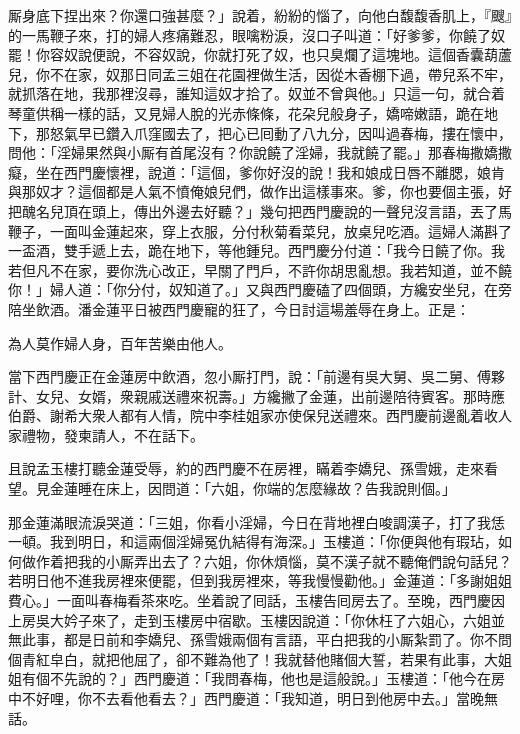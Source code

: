 厮身底下捏出來？你還口強甚麼？」說着，紛紛的惱了，向他白馥馥香肌上，『颼』的一馬鞭子來，打的婦人疼痛難忍，眼噙粉淚，沒口子叫道：「好爹爹，你饒了奴罷！你容奴說便說，不容奴說，你就打死了奴，也只臭爛了這塊地。這個香囊葫蘆兒，你不在家，奴那日同孟三姐在花園裡做生活，因從木香棚下過，帶兒系不牢，就抓落在地，{}我那裡沒尋，誰知這奴才拾了。奴並不曾與他。」{}只這一句，就合着琴童供稱一樣的話，又見婦人脫的光赤條條，花朶兒般身子，嬌啼嫩語，跪在地下，那怒氣早已鑽入爪窪國去了，把心已囘動了八九分，因叫過春梅，摟在懷中，問他：{}「淫婦果然與小厮有首尾沒有？你說饒了淫婦，我就饒了罷。」那春梅撒嬌撒癡，坐在西門慶懷裡，說道：「這個，爹你好沒的說！我和娘成日唇不離腮，娘肯與那奴才？這個都是人氣不憤俺娘兒們，做作出這樣事來。爹，你也要個主張，好把醜名兒頂在頭上，傳出外邊去好聽？」{}幾句把西門慶說的一聲兒沒言語，丟了馬鞭子，一面叫金蓮起來，穿上衣服，{}分付秋菊看菜兒，放桌兒吃酒。這婦人滿斟了一盃酒，雙手遞上去，跪在地下，等他鍾兒。西門慶分付道：「我今日饒了你。我若但凡不在家，要你洗心改正，早關了門戶，不許你胡思亂想。我若知道，並不饒你！」婦人道：「你分付，奴知道了。」{}又與西門慶磕了四個頭，方纔安坐兒，在旁陪坐飲酒。潘金蓮平日被西門慶寵的狂了，今日討這場羞辱在身上。正是：

\begin{myquote}
為人莫作婦人身，百年苦樂由他人。
\end{myquote}

當下西門慶正在金蓮房中飲酒，忽小厮打門，說：「前邊有吳大舅、吳二舅、傅夥計、女兒、女婿，衆親戚送禮來祝壽。」方纔撇了金蓮，出前邊陪待賓客。那時應伯爵、謝希大衆人都有人情，院中李桂姐家亦使保兒送禮來。{}西門慶前邊亂着收人家禮物，發柬請人，不在話下。

且說孟玉樓打聽金蓮受辱，約的西門慶不在房裡，瞞着李嬌兒、孫雪娥，走來看望。見金蓮睡在床上，因問道：「六姐，你端的怎麼緣故？告我說則個。」

那金蓮滿眼流淚哭道：「三姐，你看小淫婦，今日在背地裡白唆調漢子，打了我恁一頓。我到明日，和這兩個淫婦冤仇結得有海深。」{}玉樓道：「你便與他有瑕玷，如何做作着把我的小厮弄出去了？六姐，你休煩惱，莫不漢子就不聽俺們說句話兒？若明日他不進我房裡來便罷，但到我房裡來，等我慢慢勸他。」金蓮道：「多謝姐姐費心。」一面叫春梅看茶來吃。坐着說了囘話，玉樓告囘房去了。至晚，西門慶因上房吳大妗子來了，走到玉樓房中宿歇。玉樓因說道：「你休枉了六姐心，六姐並無此事，都是日前和李嬌兒、孫雪娥兩個有言語，平白把我的小厮紮罰了。你不問個青紅皁白，就把他屈了，卻不難為他了！我就替他賭個大誓，若果有此事，大姐姐有個不先說的？」{}西門慶道：「我問春梅，他也是這般說。」{}玉樓道：「他今在房中不好哩，你不去看他看去？」西門慶道：「我知道，明日到他房中去。」當晚無話。

